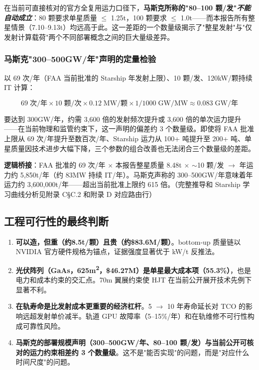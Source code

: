 在当前可直接核对的官方全复用运力口径下，\textbf{马斯克所称的"80--100 颗/发"\emph{不能自动成立}}：80 颗要求单星质量 $\leq$ 1.25\;t，100 颗要求 $\leq$ 1.0\;t——而本报告所有整星情景（7.10--9.13\;t）均远高于此。这一差距的一个数量级揭示了"整星发射"与"仅发射计算载荷"两个不同部署概念之间的巨大量级差异。

\subsubsection{马斯克"300--500\;GW/年"声明的定量检验}

以 69 次/年（FAA 当前批准的 Starship 年发射上限）、10 颗/发、120\;kW/颗持续 IT 计算：

\begin{equation}
69\;\text{次/年} \times 10\;\text{颗/次} \times 0.12\;\text{MW/颗} \times 1/1000\;\text{GW/MW} \approx 0.083\;\text{GW/年}
\end{equation}

要达到 300\;GW/年，约需 3,600 倍的发射频次提升或 3,600 倍的单次运力提升——在当前物理和监管约束下，这一声明的偏差约 3 个数量级。即使将 FAA 批准上限从 69 次/年提升至数百次/年、Starship 运力从 100+ 吨提升至 200+ 吨、单星质量因技术进步大幅下降，三个参数的组合改善也无法闭合三个数量级的差距。

\textbf{逻辑桥接}：FAA 批准的 69 次/年 $\times$ 本报告整星质量 8.48\;t $\times$ $\sim$10 颗/发 $\to$ 年运力约 5,850\;t/年（约 83\;MW 持续 IT/年）。马斯克声称的 300--500\;GW/年意味着年运力约 3,600,000\;t/年——超出当前批准上限约 615 倍。（完整推导和 Starship 学习曲线分析见附录 C\;\S C.2 和附录 D 对应路由行）

\subsection{工程可行性的最终判断}

\begin{enumerate}
    \item \textbf{可以造，但重（约8.5\;t/颗）且贵（约\$83.6M/颗）}。bottom-up 质量链以 NVIDIA 官方硬件规格为锚点，证据强度显著优于 kW/t 反推法。
    \item \textbf{光伏阵列（GaAs，625\;m\textsuperscript{2}，\$46.27M）是单星最大成本项（55.3\%）}，也是电力和成本约束的交汇点。70\;m 翼展约束使 HJT 在当前公开展开技术先例下显著不利。
    \item \textbf{在轨寿命是比发射成本更重要的经济杠杆}。5 $\to$ 10 年寿命延长对 TCO 的影响远超发射单价减半。轨道 GPU 故障率（5--15\%/年）和在轨维修不可行性构成可靠性风险。
    \item \textbf{马斯克的部署规模声明（300--500\;GW/年、80--100 颗/发）与当前公开可核对的运力约束相差约 3 个数量级}。这不是"能否实现"的问题，而是"对应什么时间尺度"的问题。
\end{enumerate}


